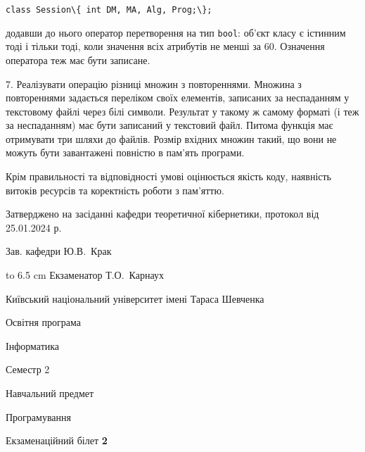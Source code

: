 \documentclass[12pt, ukrainian]{article}
\def\code#1{\Verb!#1!}
\begin{document}
{\qquad\code{class Session\{ int DM, MA, Alg, Prog;\};} 


додавши до нього оператор перетворення на тип \code{bool}: об'єкт класу є істинним тоді і тільки тоді, коли значення всіх атрибутів не менші за 60. Означення оператора теж має бути записане.%
\par
\vspace{2mm}
7. 
Реалізувати операцію різниці множин з повтореннями. Множина з повтореннями задається переліком своїх елементів, записаних за неспаданням у текстовому файлі через білі символи. Результат у такому ж самому форматі (і теж за неспаданням) має бути записаний у текстовий файл. Питома функція має отримувати три шляхи до файлів. Розмір вхідних множин такий, що вони не можуть бути завантажені повністю в пам’ять програми.

Крім правильності та відповідності умові оцінюється якість коду, наявність витоків ресурсів та коректність роботи з пам'яттю. 

}
{\smallskip\smallskip \begin {scriptsize} Затверджено на засіданні кафедри теоретичної кібернетики, протокол   від   25.01.2024 р.\par\smallskip\smallskip\smallskip\smallskip
{\parbox {6.5 cm} {Зав. кафедри \dotfill Ю.В.~Крак}}\hspace {0.7cm} {\hbox to 6.5 cm { Екзаменатор \dotfill Т.О.~Карнаух}} \end{scriptsize}}
\newpage
{{\begin {scriptsize}\par
{ \center  Київський національний університет імені Тараса Шевченка \par}
{\parbox {5 cm}{Освітня програма \hfill}{\parbox {7 cm}{Інформатика\hfill}}\parbox {6 cm}{\hfill Семестр 2}}\par
{\parbox {5 cm} {Навчальний предмет \hfill}\parbox {7 cm}{Програмування \hfill}\parbox {6cm}{\hfill}\par}\vspace{-15pt} \end{scriptsize}}{\center Екзаменаційний білет \No \textbf { 2 }\par}}
\end{document}
